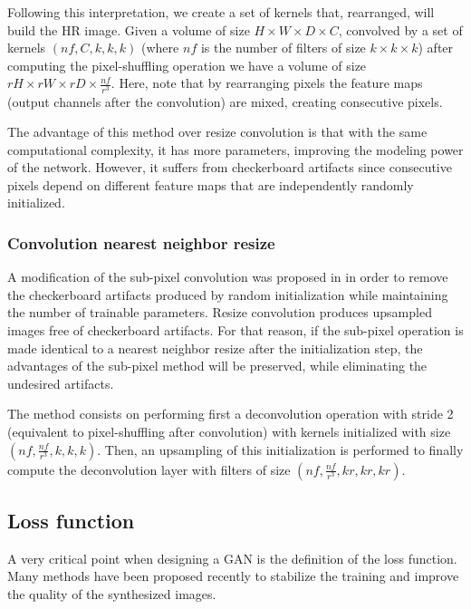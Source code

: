 \documentclass{article}
\begin{document}
Following this interpretation, we create a set of kernels that, rearranged, will build the HR image. Given a volume of size $ H \times W \times D \times C $, convolved by a set of kernels $(nf, C, k, k, k)$ (where $nf$ is the number of filters of size $k \times k \times k$) after computing the pixel-shuffling operation we have a volume of size $ rH \times rW \times rD \times \frac{nf}{r^{3}} $. Here, note that by rearranging pixels the feature maps (output channels after the convolution) are mixed, creating consecutive pixels.

The advantage of this method over resize convolution is that with the same computational complexity, it has more parameters, improving the modeling power of the network. However, it suffers from checkerboard artifacts since consecutive pixels depend on different feature maps that are independently randomly initialized.



\subsubsection{Convolution nearest neighbor resize}
\label{sssec:free_subpixel}
A modification of the sub-pixel convolution was proposed in \cite{aitken:checkboardfree} in order to remove the  checkerboard artifacts produced by random initialization while maintaining the number of trainable parameters. Resize convolution produces upsampled images free of checkerboard artifacts. For that reason, if the sub-pixel operation is made identical to a nearest neighbor resize after the initialization step, the advantages of the sub-pixel method will be preserved, while eliminating the undesired artifacts.

The method consists on performing first a deconvolution operation with stride 2 (equivalent to pixel-shuffling after convolution) with kernels initialized with size $(nf, \frac{nf}{r^{3}}, k, k, k)$. Then, an upsampling of this initialization is performed to finally compute the deconvolution layer with filters of size $(nf, \frac{nf}{r^{3}}, kr, kr, kr)$.

\subsection{Loss function}
\label{ssec:loss}
A very critical point when designing a GAN is the definition of the loss function.
Many methods have been proposed recently to stabilize the training and improve the quality of the synthesized images.
\end{document}

